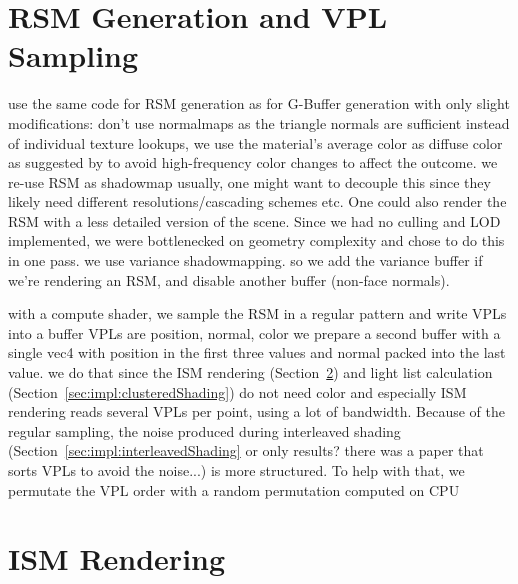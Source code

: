\section{RSM Generation and VPL Sampling}
\label{sec:impl:rsmAndVplSampling}
\begin{outline}
\1 use the same code for RSM generation as for G-Buffer generation with only slight modifications:
\1 don't use normalmaps as the triangle normals are sufficient
\1 instead of individual texture lookups, we use the material's average color as diffuse color as suggested by \citet{hedman2016sequential} to avoid high-frequency color changes to affect the outcome.
\1 we re-use RSM as shadowmap
    \2 usually, one might want to decouple this since they likely need different resolutions/cascading schemes etc. One could also render the RSM with a less detailed version of the scene. Since we had no culling and LOD implemented, we were bottlenecked on geometry complexity and chose to do this in one pass.
    \2 we use variance shadowmapping. so we add the variance buffer if we're rendering an RSM, and disable another buffer (non-face normals).

\1 with a compute shader, we sample the RSM in a regular pattern and write VPLs into a buffer
\1 VPLs are position, normal, color
\1 we prepare a second buffer with a single vec4 with position in the first three values and normal packed into the last value.
\1 we do that since the ISM rendering (Section~\ref{sec:impl:ismRendering}) and light list calculation (Section~\ref{sec:impl:clusteredShading}) do not need color and especially ISM rendering reads several VPLs per point, using a lot of bandwidth.
\1 Because of the regular sampling, the noise produced during interleaved shading (Section~\ref{sec:impl:interleavedShading} or only results? there was a paper that sorts VPLs to avoid the noise...) is more structured. To help with that, we permutate the VPL order with a random permutation computed on CPU
\end{outline}


\section{ISM Rendering}
\label{sec:impl:ismRendering}

